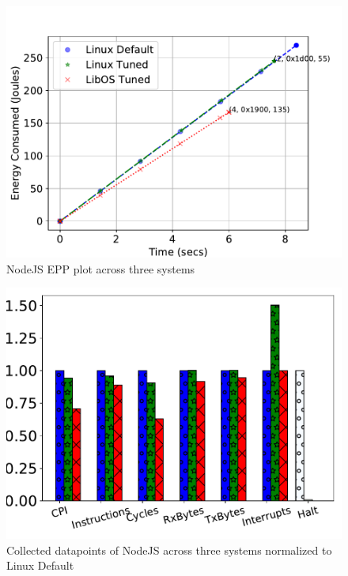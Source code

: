 \begin{figure}[t]
	\includegraphics[width=\columnwidth]{osdi_figures/nodejs_edp.pdf}
	\caption{NodeJS EPP plot across three systems}
	\label{fig:nodejs_epp}
\end{figure}
\begin{figure}[t]
	\includegraphics[width=\columnwidth]{osdi_figures/nodejs_barplot.pdf}
	\caption{Collected datapoints of NodeJS across three systems normalized to Linux Default}
	\label{fig:nodejs_bar}
\end{figure}
